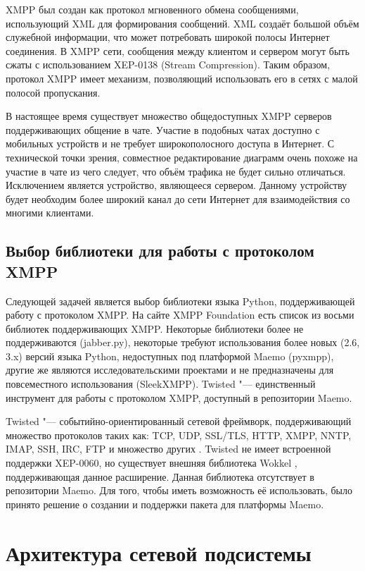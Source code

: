 XMPP был создан как протокол мгновенного обмена сообщениями, использующий XML
для формирования сообщений. XML создаёт большой объём служебной информации, что
может потребовать широкой полосы Интернет соединения. В XMPP сети, сообщения
между клиентом и сервером могут быть сжаты с использованием XEP-0138 (Stream
Compression). Таким образом, протокол XMPP имеет механизм, позволяющий
использовать его в сетях с малой полосой пропускания.

В настоящее время существует множество общедоступных XMPP серверов
поддерживающих общение в чате. Участие в подобных чатах доступно с мобильных
устройств и не требует широкополосного доступа в Интернет. С технической точки
зрения, совместное редактирование диаграмм очень похоже на участие в чате из
чего следует, что объём трафика не будет сильно отличаться. Исключением является
устройство, являющееся сервером. Данному устройству будет необходим более
широкий канал до сети Интернет для взаимодействия со многими клиентами.

\subsection{Выбор библиотеки для работы с протоколом XMPP}
Следующей задачей является выбор библиотеки языка Python, поддерживающей работу
с протоколом XMPP. На сайте XMPP Foundation \cite{xmpp} есть список
из восьми библиотек поддерживающих XMPP. Некоторые библиотеки более не
поддерживаются (jabber.py), некоторые требуют использования более новых (2.6,
3.x) версий языка Python, недоступных под платформой Maemo (pyxmpp), другие же
являются исследовательскими проектами и не предназначены для повсеместного
использования (SleekXMPP). Twisted "--- единственный инструмент для работы с
протоколом XMPP, доступный в репозитории Maemo.

Twisted "--- событийно-ориентированный сетевой фреймворк, поддерживающий
множество протоколов таких как: TCP, UDP, SSL/TLS, HTTP, XMPP, NNTP, IMAP, SSH,
IRC, FTP и множество других \cite{twisted}. Twisted не имеет встроенной
поддержки XEP-0060, но существует внешняя библиотека Wokkel \cite{wokkel},
поддерживающая данное расширение. Данная библиотека отсутствует в репозитории
Maemo. Для того, чтобы иметь возможность её использовать, было принято решение о
создании и поддержки пакета для платформы Maemo.

\section{Архитектура сетевой подсистемы}
